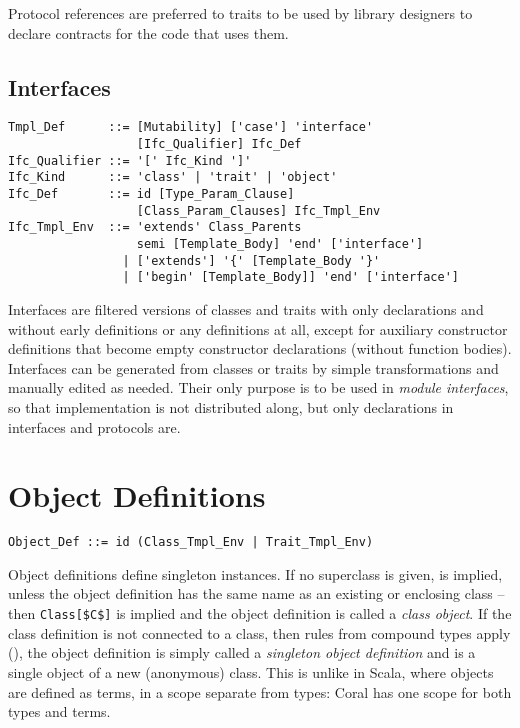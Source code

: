 Protocol references are preferred to traits to be used by library designers to declare contracts for the code that uses them. 







\subsection{Interfaces}
\label{sec:interfaces}

\syntax\begin{lstlisting}
Tmpl_Def      ::= [Mutability] ['case'] 'interface' 
                  [Ifc_Qualifier] Ifc_Def
Ifc_Qualifier ::= '[' Ifc_Kind ']'
Ifc_Kind      ::= 'class' | 'trait' | 'object'
Ifc_Def       ::= id [Type_Param_Clause]
                  [Class_Param_Clauses] Ifc_Tmpl_Env
Ifc_Tmpl_Env  ::= 'extends' Class_Parents
                  semi [Template_Body] 'end' ['interface']
                | ['extends'] '{' [Template_Body '}'
                | ['begin' [Template_Body]] 'end' ['interface']
\end{lstlisting}

Interfaces are filtered versions of classes and traits with only declarations and without early definitions or any definitions at all, except for auxiliary constructor definitions that become empty constructor declarations (without function bodies). Interfaces can be generated from classes or traits by simple transformations and manually edited as needed. Their only purpose is to be used in {\em module interfaces}, so that implementation is not distributed along, but only declarations in interfaces and protocols are. 






\section{Object Definitions}
\label{sec:object-definitions}

\syntax\begin{lstlisting}
Object_Def ::= id (Class_Tmpl_Env | Trait_Tmpl_Env)
\end{lstlisting}

Object definitions define singleton instances. If no superclass is given,  is implied, unless the object definition has the same name as an existing or enclosing class -- then \lstinline!Class[$C$]! is implied and the object definition is called a {\em class object}. If the class definition is not connected to a class, then rules from compound types apply (), the object definition is simply called a {\em singleton object definition} and is a single object of a new (anonymous) class. This is unlike in Scala, where objects are defined as terms, in a scope separate from types: Coral has one scope for both types and terms. 

